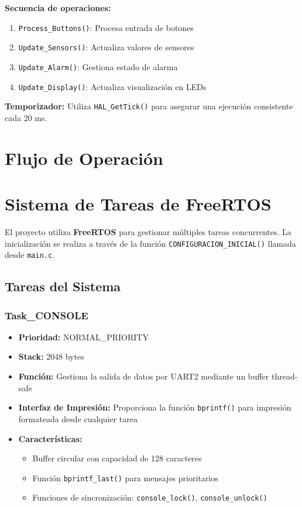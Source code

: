 \documentclass[12pt,a4paper]{article}
\begin{document}
\textbf{Secuencia de operaciones:}
\begin{enumerate}
    \item \texttt{Process\_Buttons()}: Procesa entrada de botones
    \item \texttt{Update\_Sensors()}: Actualiza valores de sensores
    \item \texttt{Update\_Alarm()}: Gestiona estado de alarma
    \item \texttt{Update\_Display()}: Actualiza visualización en LEDs
\end{enumerate}

\textbf{Temporizador:} Utiliza \texttt{HAL\_GetTick()} para asegurar una ejecución consistente cada 20 ms.

\section{Flujo de Operación}

\section{Sistema de Tareas de FreeRTOS}

El proyecto utiliza \textbf{FreeRTOS} para gestionar múltiples tareas concurrentes. La inicialización se realiza a través de la función \texttt{CONFIGURACION\_INICIAL()} llamada desde \texttt{main.c}.

\subsection{Tareas del Sistema}

\subsubsection{Task\_CONSOLE}
\begin{itemize}
    \item \textbf{Prioridad:} NORMAL\_PRIORITY
    \item \textbf{Stack:} 2048 bytes
    \item \textbf{Función:} Gestiona la salida de datos por UART2 mediante un buffer thread-safe
    \item \textbf{Interfaz de Impresión:} Proporciona la función \texttt{bprintf()} para impresión formateada desde cualquier tarea
    \item \textbf{Características:} 
    \begin{itemize}
        \item Buffer circular con capacidad de 128 caracteres
        \item Función \texttt{bprintf\_last()} para mensajes prioritarios
        \item Funciones de sincronización: \texttt{console\_lock()}, \texttt{console\_unlock()}
    \end{itemize}
\end{itemize}
\end{document}
